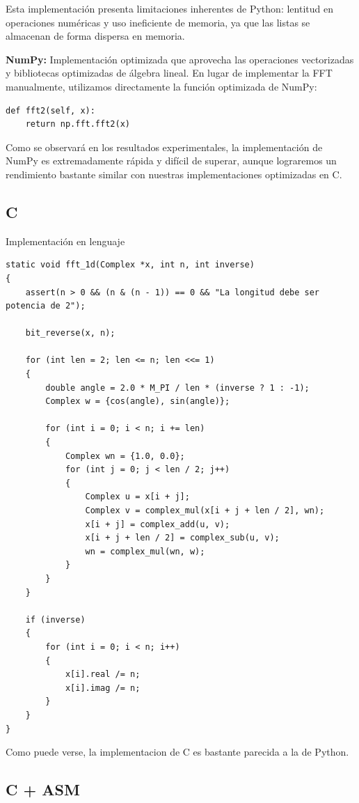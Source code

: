 \documentclass[a4paper]{article}
\begin{document}
Esta implementación presenta limitaciones inherentes de Python: lentitud en operaciones numéricas y uso ineficiente de memoria, ya que las listas se almacenan de forma dispersa en memoria.

\textbf{NumPy:} Implementación optimizada que aprovecha las operaciones vectorizadas y bibliotecas optimizadas de álgebra lineal. En lugar de implementar la FFT manualmente, utilizamos directamente la función optimizada de NumPy:

\begin{verbatim}
def fft2(self, x):
    return np.fft.fft2(x)
\end{verbatim}

Como se observará en los resultados experimentales, la implementación de NumPy es extremadamente rápida y difícil de superar, aunque lograremos un rendimiento bastante similar con nuestras implementaciones optimizadas en C.

\subsection{C}
Implementación en lenguaje

\begin{verbatim}
static void fft_1d(Complex *x, int n, int inverse)
{
    assert(n > 0 && (n & (n - 1)) == 0 && "La longitud debe ser potencia de 2");

    bit_reverse(x, n);

    for (int len = 2; len <= n; len <<= 1)
    {
        double angle = 2.0 * M_PI / len * (inverse ? 1 : -1);
        Complex w = {cos(angle), sin(angle)};

        for (int i = 0; i < n; i += len)
        {
            Complex wn = {1.0, 0.0};
            for (int j = 0; j < len / 2; j++)
            {
                Complex u = x[i + j];
                Complex v = complex_mul(x[i + j + len / 2], wn);
                x[i + j] = complex_add(u, v);
                x[i + j + len / 2] = complex_sub(u, v);
                wn = complex_mul(wn, w);
            }
        }
    }

    if (inverse)
    {
        for (int i = 0; i < n; i++)
        {
            x[i].real /= n;
            x[i].imag /= n;
        }
    }
}
\end{verbatim}

Como puede verse, la implementacion de C es bastante parecida a la de Python.

\subsection{C + ASM}
\end{document}
